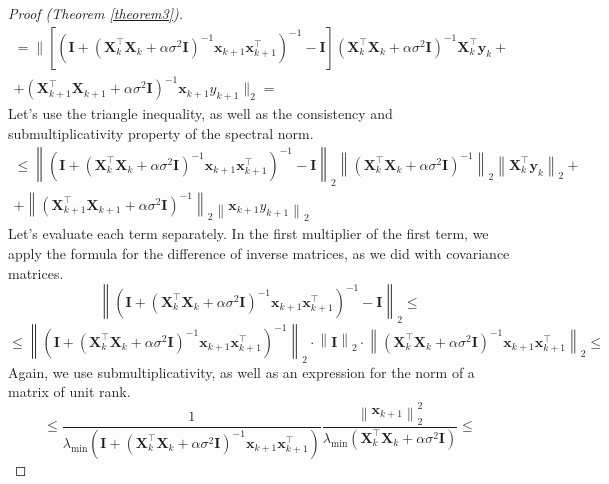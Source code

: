 \documentclass[
11pt,%
tightenlines,%
twoside,%
onecolumn,%
nofloats,%
nobibnotes,%
nofootinbib,%
superscriptaddress,%
noshowpacs,%
centertags]%
{revtex4-2}
\begin{document}
\begin{proof}[Proof (Theorem \ref{theorem3})]
    \begin{multline*}
        = \Bigg\| \left[ \left( \mathbf{I} + \left( \mathbf{X}_k^{\top} \mathbf{X}_k + \alpha \sigma^2 \mathbf{I} \right)^{-1} \mathbf{x}_{k+1} \mathbf{x}_{k+1}^{\top} \right)^{-1} - \mathbf{I} \right] \left( \mathbf{X}_k^{\top} \mathbf{X}_k + \alpha \sigma^2 \mathbf{I} \right)^{-1} \mathbf{X}_k^{\top} \mathbf{y}_k + \\ + \left( \mathbf{X}_{k+1}^{\top} \mathbf{X}_{k+1} + \alpha \sigma^2 \mathbf{I} \right)^{-1} \mathbf{x}_{k+1} y_{k+1} \Bigg\|_2 =
    \end{multline*}
    Let's use the triangle inequality, as well as the consistency and submultiplicativity property of the spectral norm.
    \begin{multline*}
        \leqslant \left\| \left( \mathbf{I} + \left( \mathbf{X}_k^{\top} \mathbf{X}_k + \alpha \sigma^2 \mathbf{I} \right)^{-1} \mathbf{x}_{k+1} \mathbf{x}_{k+1}^{\top} \right)^{-1} - \mathbf{I} \right\|_2 \left\| \left( \mathbf{X}_k^{\top} \mathbf{X}_k + \alpha \sigma^2 \mathbf{I} \right)^{-1} \right\|_2 \left\| \mathbf{X}_k^{\top} \mathbf{y}_k \right\|_2 + \\ + \left\| \left( \mathbf{X}_{k+1}^{\top} \mathbf{X}_{k+1} + \alpha \sigma^2 \mathbf{I} \right)^{-1} \right\|_2 \left\| \mathbf{x}_{k+1} y_{k+1} \right\|_2
    \end{multline*}
    Let's evaluate each term separately. In the first multiplier of the first term, we apply the formula for the difference of inverse matrices, as we did with covariance matrices.
    \[ \left\| \left( \mathbf{I} + \left( \mathbf{X}_k^{\top} \mathbf{X}_k + \alpha \sigma^2 \mathbf{I} \right)^{-1} \mathbf{x}_{k+1} \mathbf{x}_{k+1}^{\top} \right)^{-1} - \mathbf{I} \right\|_2 \leqslant \]
    \[ \leqslant \left\| \left( \mathbf{I} + \left( \mathbf{X}_k^{\top} \mathbf{X}_k + \alpha \sigma^2 \mathbf{I} \right)^{-1} \mathbf{x}_{k+1} \mathbf{x}_{k+1}^{\top} \right)^{-1} \right\|_2 \cdot \left\| \mathbf{I} \right\|_2 \cdot \left\| \left( \mathbf{X}_k^{\top} \mathbf{X}_k + \alpha \sigma^2 \mathbf{I} \right)^{-1} \mathbf{x}_{k+1} \mathbf{x}_{k+1}^{\top} \right\|_2 \leqslant \]
    Again, we use submultiplicativity, as well as an expression for the norm of a matrix of unit rank.
    \[ \leqslant \dfrac{1}{\lambda_{\min}\left( \mathbf{I} + \left( \mathbf{X}_k^{\top} \mathbf{X}_k + \alpha \sigma^2 \mathbf{I} \right)^{-1} \mathbf{x}_{k+1} \mathbf{x}_{k+1}^{\top} \right)} \dfrac{\left\| \mathbf{x}_{k+1} \right\|_2^2}{\lambda_{\min}\left( \mathbf{X}_k^{\top} \mathbf{X}_k + \alpha \sigma^2 \mathbf{I} \right)} \leqslant \]

\end{proof}
\end{document}
